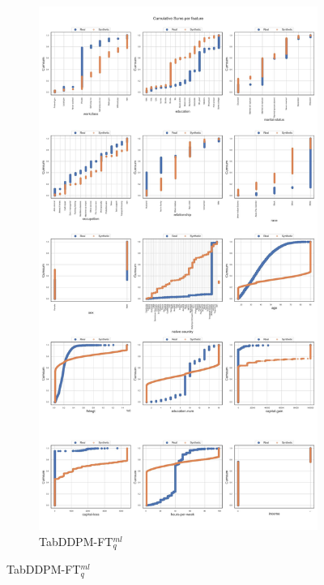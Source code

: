 \newpage
\begin{landscape}
	\begin{figure}[h]
		\centering
		\hfill
		\begin{subfigure}{0.4\linewidth}
			\includegraphics[height=\textheight,width=\linewidth,keepaspectratio]{images/cumsums/tab-ddpm-ft.jpg}
			\caption{TabDDPM-FT$^{ml}_q$}
		\end{subfigure}

\end{figure}
\end{landscape}
